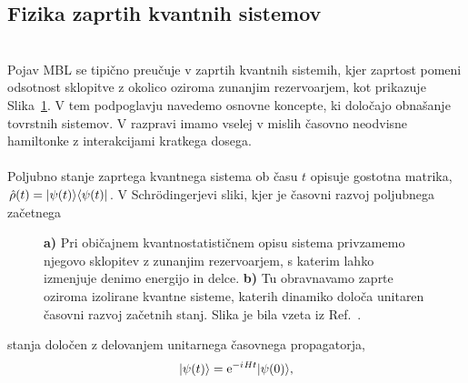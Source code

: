 \subsection{Fizika zaprtih kvantnih sistemov}
\begin{minipage}[t]{0.42\textwidth}
\noindent \\
Pojav MBL se tipično preučuje v zaprtih kvantnih sistemih, kjer zaprtost pomeni odsotnost sklopitve z okolico oziroma zunanjim rezervoarjem, kot prikazuje Slika~\ref{fig:nandkishore_huse_reservoir}. V tem podpoglavju navedemo osnovne koncepte, ki določajo obnašanje tovrstnih sistemov. V razpravi imamo vselej v mislih časovno neodvisne hamiltonke z interakcijami kratkega dosega. \\\\
Poljubno stanje zaprtega kvantnega sistema ob času $t$ opisuje gostotna matrika, $\hat{\rho}(t)=\vert\psi(t)\rangle\langle \psi(t) \vert$. V Schrödingerjevi sliki, kjer je časovni razvoj poljubnega začetnega 
\end{minipage}\hfill
\begin{minipage}[t]{0.55\textwidth}
\begin{figure}[H]
\caption{
\textbf{a)} Pri običajnem kvantnostatističnem opisu sistema privzamemo njegovo sklopitev z zunanjim rezervoarjem, s katerim lahko izmenjuje denimo energijo in delce. \textbf{b)} Tu obravnavamo zaprte oziroma izolirane kvantne sisteme, katerih dinamiko določa unitaren časovni razvoj začetnih stanj. 
Slika je bila vzeta iz Ref.~\cite{nandkishore2015many}. 
}
\label{fig:nandkishore_huse_reservoir}
\end{figure}
\end{minipage}
 stanja določen z delovanjem unitarnega časovnega propagatorja, 
\begin{equation}\label{eq:cas_razvoj}
\vert\psi(t)\rangle=\mathrm{e}^{-{i\mkern1mu} H t}\vert\psi(0)\rangle,
\end{equation}
